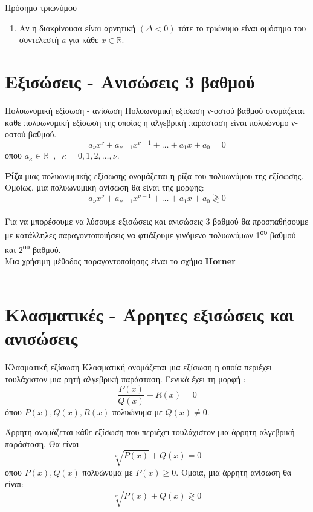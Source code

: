 \begin{thewrhma}{Πρόσημο τριωνύμου}
\begin{center}
\end{center}
\begin{enumerate}[itemsep=0mm,start=3]
\item Αν η διακρίνουσα είναι αρνητική $\left( \varDelta<0\right)  $ τότε το τριώνυμο είναι
ομόσημο του συντελεστή $ a $ για κάθε $ x\in\mathbb{R}$.
\end{enumerate}
\begin{center}
\end{center}
\end{thewrhma}
\section{Εξισώσεις - Ανισώσεις 3 βαθμού}
\orismoi
\begin{orismos}{Πολυωνυμική εξίσωση - ανίσωση}
Πολυωνυμική εξίσωση ν-οστού βαθμού ονομάζεται κάθε πολυωνυμική εξίσωση της οποίας η αλγεβρική παράσταση είναι πολυώνυμο ν-οστού βαθμού.
\[ a_\nu x^\nu+a_{\nu-1}x^{\nu-1}+\ldots+a_1x+a_0=0 \]
όπου $ a_\kappa\in\mathbb{R}\;\;,\;\;\kappa=0,1,2,\ldots,\nu $.
\end{orismos}
\textbf{Ρίζα} μιας πολυωνυμικής εξίσωσης ονομάζεται η ρίζα του πολυωνύμου της εξίσωσης. Ομοίως, μια πολυωνυμική ανίσωση θα είναι της μορφής:
\[ a_\nu x^\nu+a_{\nu-1}x^{\nu-1}+\ldots+a_1x+a_0\gtrless0 \]\\
Για να μπορέσουμε να λύσουμε εξισώσεις και ανισώσεις 3 βαθμού θα προσπαθήσουμε με κατάλληλες παραγοντοποιήσεις να φτιάξουμε γινόμενο πολυωνύμων 1\textsuperscript{ου} βαθμού και 2\textsuperscript{ου} βαθμού. \\Μια χρήσιμη μέθοδος παραγοντοποίησης είναι το σχήμα \textbf{Horner}  \\\\
\section{Κλασματικές - Άρρητες εξισώσεις και ανισώσεις}
\orismoi
\begin{orismos}{Κλασματική εξίσωση}
Κλασματική ονομάζεται μια εξίσωση η οποία περιέχει τουλάχιστον μια ρητή αλγεβρική παράσταση. Γενικά έχει τη μορφή :
\[ \dfrac{P(x)}{Q(x)}+R(x)= 0\]
όπου $ P(x),Q(x),R(x) $ πολυώνυμα με $ Q(x)\neq0 $.
\end{orismos}
Άρρητη ονομάζεται κάθε εξίσωση που περιέχει τουλάχιστον μια άρρητη αλγεβρική παράσταση. Θα είναι
\[ \sqrt[\nu]{P(x)}+Q(x)=0 \]
όπου $ P(x),Q(x) $ πολυώνυμα με $ P(x)\geq0 $. Όμοια, μια άρρητη ανίσωση θα είναι:
\[ \sqrt[\nu]{P(x)}+Q(x)\gtrless0 \]
